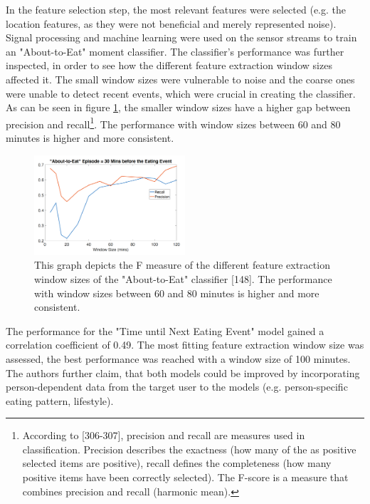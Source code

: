 In the feature selection step, the most relevant features were selected (e.g. the location features, as they were not beneficial and merely represented noise). Signal processing and machine learning were used on the sensor streams to train an "About-to-Eat" moment classifier. The classifier's performance was further inspected, in order to see how the different feature extraction window sizes affected it. The small window sizes were vulnerable to noise and the coarse ones were unable to detect recent events, which were crucial in creating the classifier. As can be seen in figure \ref{figure:windowSize}, the smaller window sizes have a higher gap between precision and recall\footnote{According to \textcite{han2011data}[306-307], precision and recall are measures used in classification. Precision describes the exactness (how many of the as positive selected items are positive), recall defines the completeness (how many positive items have been correctly selected). The F-score is a measure that combines precision and recall (harmonic mean).}. The performance with window sizes between 60 and 80 minutes is higher and more consistent.

\begin{figure}[h]
  \centering
  \includegraphics[width=0.5\textwidth]{./images/windowSizePerformance.png}
  \caption{This graph depicts the F measure of the different feature extraction window sizes of the "About-to-Eat" classifier \autocite{AboutToEat2016Rahman}[148]. The performance with window sizes between 60 and 80 minutes is higher and more consistent. }
  \label{figure:windowSize}
\end{figure}

The performance for the "Time until Next Eating Event" model gained a correlation coefficient of 0.49. The most fitting feature extraction window size was assessed, the best performance was reached with a window size of 100 minutes. The authors further claim, that both models could be improved by incorporating person-dependent data from the target user to the models (e.g. person-specific eating pattern, lifestyle).

